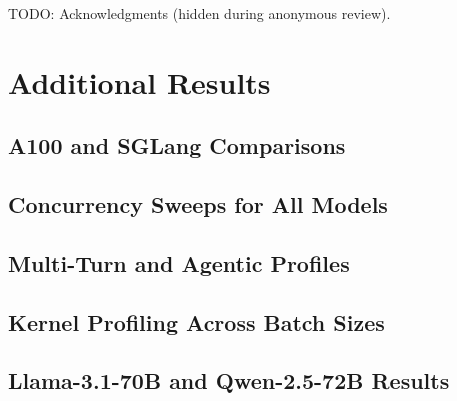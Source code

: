 \documentclass{article}
\begin{document}





\begin{ack}
  TODO: Acknowledgments (hidden during anonymous review).
\end{ack}






\appendix

\section{Additional Results}
\label{app:results}

\subsection{A100 and SGLang Comparisons}
\label{sec:appendix_hw}

\subsection{Concurrency Sweeps for All Models}
\label{sec:appendix_sweeps}

\subsection{Multi-Turn and Agentic Profiles}
\label{sec:appendix_multiturn}

\subsection{Kernel Profiling Across Batch Sizes}
\label{sec:appendix_scaling}

\subsection{Llama-3.1-70B and Qwen-2.5-72B Results}
\label{sec:appendix_70b}

\newpage
% 
\end{document}
